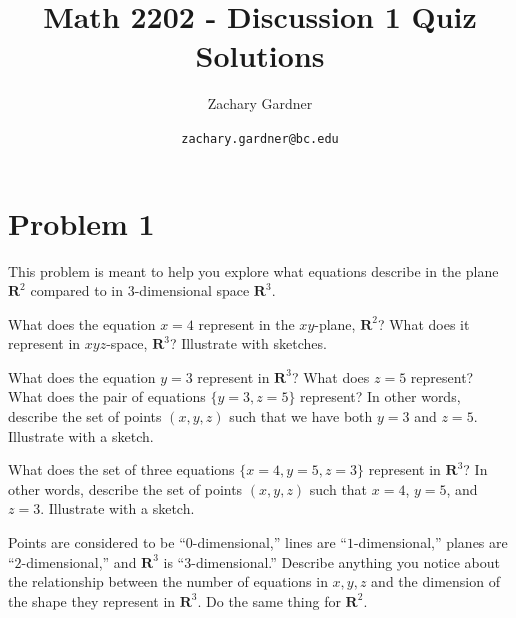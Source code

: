 \documentclass[11pt]{article}
\renewcommand{\R}{\mathbf{R}}
\begin{document}
\title{Math 2202 - Discussion 1 Quiz Solutions}
\author{Zachary Gardner}
\date{\texttt{zachary.gardner@bc.edu}}
\maketitle

\section*{Problem 1}
This problem is meant to help you explore what equations describe in the plane $\R^2$ compared to in $3$-dimensional space $\R^3$.
\begin{enum}{\alph}
\item What does the equation $x=4$ represent in the $xy$-plane, $\R^2$? What does it represent in $xyz$-space, $\R^3$? Illustrate with sketches.

\item What does the equation $y=3$ represent in $\R^3$? What does $z=5$ represent? What does the pair of equations $\{y=3,z=5\}$ represent? In other words, describe the set of points $(x,y,z)$ such that we have both $y=3$ and $z=5$. Illustrate with a sketch.

\item What does the set of three equations $\{x=4,y=5,z=3\}$ represent in $\R^3$? In other words, describe the set of points $(x,y,z)$ such that $x=4$, $y=5$, and $z=3$. Illustrate with a sketch.

\item Points are considered to be ``$0$-dimensional,'' lines are ``$1$-dimensional,'' planes are ``$2$-dimensional,'' and $\R^3$ is ``$3$-dimensional.'' Describe anything you notice about the relationship between the number of equations in $x,y,z$ and the dimension of the shape they represent in $\R^3$. Do the same thing for $\R^2$.
\end{enum}
\end{document}
